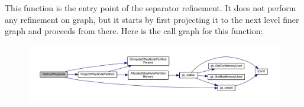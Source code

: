 This function is the entry point of the separator refinement. It does not perform any refinement on graph, but it starts by first projecting it to the next level finer graph and proceeds from there. Here is the call graph for this function\+:\nopagebreak
\begin{figure}[H]
\begin{center}
\leavevmode
\includegraphics[width=350pt]{a00278_a2fd4bd5f789c1c1248aa326d0cac9023_cgraph}
\end{center}
\end{figure}
